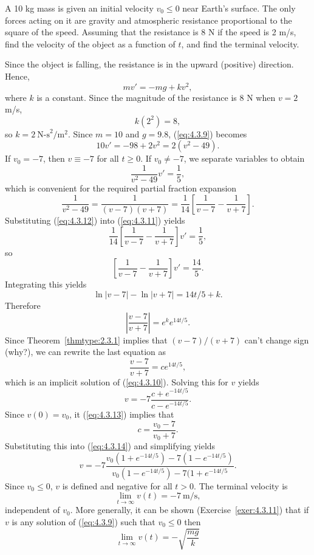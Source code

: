 \documentclass{ximera}
\begin{document}
\begin{example}\label{example:4.3.3}
A 10 kg mass is given an initial velocity $v_0\leq 0$
 near Earth's surface. The only forces acting on it are
gravity and atmospheric resistance proportional to the square of the
speed. Assuming that the resistance is 8 N if the speed is 2 m/s,
find the velocity of the object as a function of $t$, and
find the terminal velocity.
 
\begin{explanation} Since the object is falling, the resistance is in the upward
(positive) direction. Hence,
\begin{equation} \label{eq:4.3.9}
mv'=-mg+kv^2,
\end{equation}
where $k$ is a constant. Since the magnitude of the resistance is 8 N
when $v=2$ m/s,
$$
k(2^2)=8,
$$
 so $k=2\  \mbox{N-s}^2/\mbox{m}^2$.  Since
$m=10$ and $g=9.8$, (\ref{eq:4.3.9}) becomes
\begin{equation} \label{eq:4.3.10}
10v'=-98+2v^2=2(v^2-49).
\end{equation}
If $v_0=-7$, then $v\equiv-7$ for all $t\geq 0$. If $v_0\neq -7$,
we separate  variables to obtain
\begin{equation} \label{eq:4.3.11}
\frac{1}{v^2-49}v'=\frac{1}{5},
\end{equation}
which is convenient for the required partial fraction expansion
\begin{equation} \label{eq:4.3.12}
\frac{1}{v^2-49} =\frac{1}{(v-7)(v+7)}
=\frac{1}{14}\left[\frac{1}{v-7}
-\frac{1}{v+7}\right].
\end{equation}
 Substituting (\ref{eq:4.3.12})  into (\ref{eq:4.3.11}) yields
$$
\frac{1}{14}\left[\frac{1}{v-7}-\frac{1}{v+7}\right]v'=\frac{1}{5},
$$
 so
$$
\left[\frac{1}{v-7}-\frac{1}{v+7}\right]v'=\frac{14}{5}.
$$
Integrating this yields
$$
\ln |v-7|-\ln|v+7|=14t/5+k.
$$
Therefore
$$
\left|\frac{v-7}{v+7}\right|=e^ke^{14t/5}.
$$
Since  Theorem~\ref{thmtype:2.3.1}  implies  that  $(v-7)/(v+7)$   can't
change sign (why?), we can rewrite the last equation as
 \begin{equation} \label{eq:4.3.13}
 \frac{v-7}{v+7}=ce^{14t/5},
\end{equation}
which is an implicit solution of (\ref{eq:4.3.10}).
Solving this for $v$ yields
\begin{equation} \label{eq:4.3.14}
v=-7\frac{c+e^{-14t/5}}{c-e^{-14t/5}}.
\end{equation}
 Since $v(0)=v_0$, it
 (\ref{eq:4.3.13}) implies that
$$
c=\frac{v_0-7}{v_0+7}.
$$
 Substituting this into (\ref{eq:4.3.14}) and simplifying yields
$$
v=-7\frac{v_0(1+e^{-14t/5})-7(1-e^{-14t/5})}{v_0(1-e^{-14t/5})-7(1+e^{-14t/5}}.
$$
Since $v_0\leq 0$, $v$ is defined and negative for all
$t>0$. The terminal velocity is
$$
\lim_{t\to\infty} v(t)=-7\  \mbox{m/s},
$$
independent of $v_0$. More generally, it
can be shown (Exercise~\ref{exer:4.3.11}) that if $v$ is any solution
of (\ref{eq:4.3.9}) such that $v_0\leq 0$ then
$$
\lim_{t\to\infty}v(t)=-\sqrt{\frac{mg}{k}}
$$



\end{explanation}
\end{example}
\end{document}
